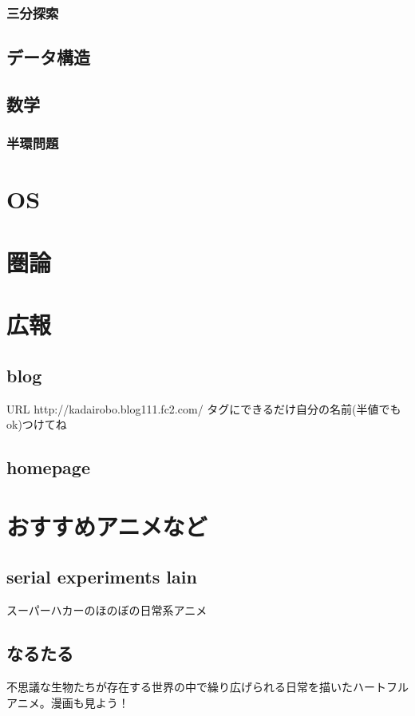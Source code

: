 \documentclass{jarticle}
\begin{document}
      \subsubsection{三分探索}
   \subsection{データ構造}
   \subsection{数学}
      \subsubsection{半環問題}
\clearpage

\section{OS}
\clearpage

\section{圏論}
\clearpage

\section{広報}
   \subsection{blog}
      URL http://kadairobo.blog111.fc2.com/
      タグにできるだけ自分の名前(半値でもok)つけてね
   \subsection{homepage}
\clearpage

\section{おすすめアニメなど}
   \subsection{serial experiments lain}
      スーパーハカーのほのぼの日常系アニメ
   \subsection{なるたる}
      不思議な生物たちが存在する世界の中で繰り広げられる日常を描いたハートフルアニメ。漫画も見よう！
\end{document}
